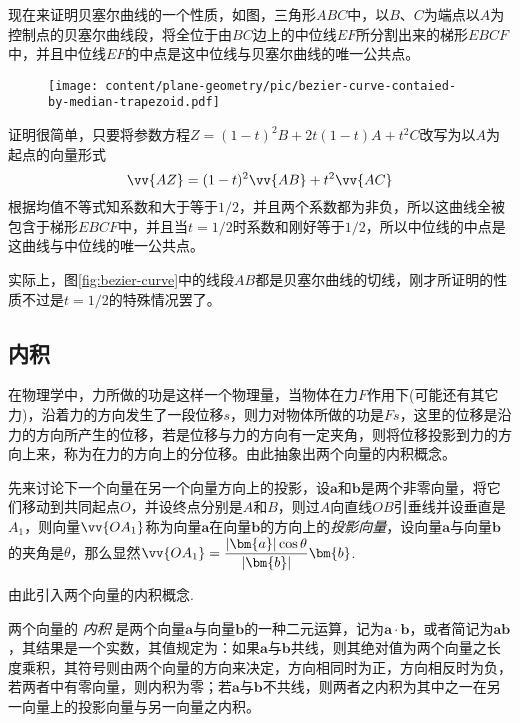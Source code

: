 \begin{example}
现在来证明贝塞尔曲线的一个性质，如图，三角形$ABC$中，以$B$、$C$为端点以$A$为控制点的贝塞尔曲线段，将全位于由$BC$边上的中位线$EF$所分割出来的梯形$EBCF$中，并且中位线$EF$的中点是这中位线与贝塞尔曲线的唯一公共点。

\begin{figure}[htbp]
\centering
\texttt{[image: content/plane-geometry/pic/bezier-curve-contaied-by-median-trapezoid.pdf]}
\caption{}
\label{fig:bezier-curve-contaied-by-median-trapezoid}
\end{figure}

证明很简单，只要将参数方程$Z = (1-t)^2B + 2t(1-t)A + t^2C$改写为以$A$为起点的向量形式
\begin{equation*}
  \vv{AZ} = (1-t)^2\vv{AB} + t^2 \vv{AC}
\end{equation*}
根据均值不等式知系数和大于等于$1/2$，并且两个系数都为非负，所以这曲线全被包含于梯形$EBCF$中，并且当$t=1/2$时系数和刚好等于$1/2$，所以中位线的中点是这曲线与中位线的唯一公共点。

实际上，图\ref{fig:bezier-curve}中的线段$AB$都是贝塞尔曲线的切线，刚才所证明的性质不过是$t=1/2$的特殊情况罢了。
\end{example}



\subsection{内积}
\label{sec:inner-product-of-vector}

在物理学中，力所做的功是这样一个物理量，当物体在力$F$作用下(可能还有其它力)，沿着力的方向发生了一段位移$s$，则力对物体所做的功是$Fs$，这里的位移是沿力的方向所产生的位移，若是位移与力的方向有一定夹角，则将位移投影到力的方向上来，称为在力的方向上的分位移。由此抽象出两个向量的内积概念。

先来讨论下一个向量在另一个向量方向上的投影，设$\bm{a}$和$\bm{b}$是两个非零向量，将它们移动到共同起点$O$，并设终点分别是$A$和$B$，则过$A$向直线$OB$引垂线并设垂直是$A_1$，则向量$\vv{OA_1}$称为向量$\bm{a}$在向量$\bm{b}$的方向上的\emph{投影向量}，设向量$\bm{a}$与向量$\bm{b}$的夹角是$\theta$，那么显然$\vv{OA_1}=\dfrac{|\bm{a}|\cos{\theta}}{|\bm{b}|}\bm{b}$.

由此引入两个向量的内积概念.
\begin{definition}
  两个向量的 \emph{内积} 是两个向量$\bm{a}$与向量$\bm{b}$的一种二元运算，记为$\bm{a} \cdot \bm{b}$，或者简记为$\bm{a}\bm{b}$，其结果是一个实数，其值规定为：如果$\bm{a}$与$\bm{b}$共线，则其绝对值为两个向量之长度乘积，其符号则由两个向量的方向来决定，方向相同时为正，方向相反时为负，若两者中有零向量，则内积为零；若$\bm{a}$与$\bm{b}$不共线，则两者之内积为其中之一在另一向量上的投影向量与另一向量之内积。
\end{definition}

